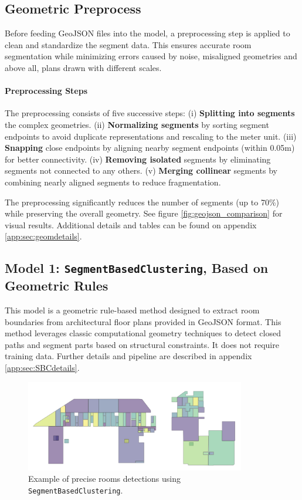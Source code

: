 \documentclass[11pt]{article}
\begin{document}
\subsection{Geometric Preprocess}
\label{sec:geometric_preprocess}

Before feeding GeoJSON files into the model, a preprocessing step is applied to 
clean and standardize the segment data. This ensures accurate room segmentation 
while minimizing errors caused by noise, misaligned geometries and above all,
plans drawn with different scales.

\paragraph{Preprocessing Steps}
The preprocessing consists of five successive steps:
(i) \textbf{Splitting into segments} the complex geometries.
(ii) \textbf{Normalizing segments} by sorting segment endpoints to avoid duplicate representations and rescaling to the meter unit.
(iii) \textbf{Snapping} close endpoints by aligning nearby segment endpoints (within 0.05m) for better connectivity.
(iv) \textbf{Removing isolated} segments by eliminating segments not connected to any others.
(v) \textbf{Merging collinear} segments by combining nearly aligned segments to reduce fragmentation.

The preprocessing significantly reduces the number of segments (up to 70\%) while 
preserving the overall geometry. See figure \ref{fig:geojson_comparison} for visual 
results.
Additional details and tables can be found on appendix \ref{app:sec:geomdetails}.


\subsection{Model 1: \texttt{SegmentBasedClustering}, Based on Geometric Rules}

This model is a geometric rule-based method designed to extract room boundaries
from architectural floor plans provided in GeoJSON format.
This method 
leverages classic computational geometry techniques to detect closed paths
and segment parts based on structural constraints. It does not require training data.
Further details and pipeline  are described in appendix \ref{app:sec:SBCdetails}. 


\begin{figure}[h]
    \centering
    \includegraphics[width=0.6\linewidth, height=4cm, keepaspectratio]{figures/simplemodel.png}
    \caption{Example of precise rooms detections using \texttt{SegmentBasedClustering}.}
    \label{fig:closed_paths}
\end{figure}
\end{document}
